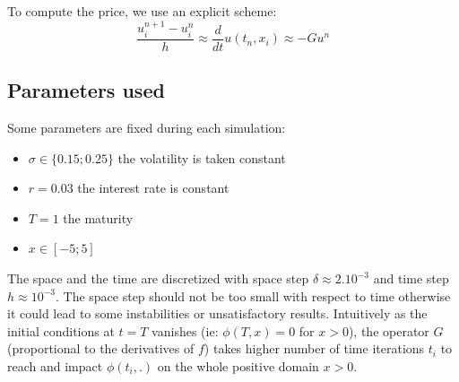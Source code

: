 \documentclass{article}
\begin{document}
To compute the price, we use an explicit scheme:
\[
	\frac{u_{i}^{n+1} -u_{i}^{n}}{h} \approx \frac{d}{dt} u(t_n,x_i)\approx -Gu^{n}
\]

\subsection*{Parameters used}

Some parameters are fixed during each simulation:

\begin{itemize}[label=$\cdot$]
    \item $\sigma\in\{0.15;0.25\}$ the volatility is taken constant
    \item $r=0.03$ the interest rate is constant 
    \item $T=1$ the maturity
    \item $x\in[-5;5]$ 
\end{itemize}

The space and the time are discretized with  space step $\delta \approx 2.10^{-3}$ and time step $h \approx 10^{-3}$.
The space step should not be too small with respect to time otherwise it could lead to some instabilities or unsatisfactory
results. Intuitively as the initial conditions at $t=T$ vanishes (ie: $\phi(T,x) = 0$ for $x > 0$),
the operator $G$ (proportional to the derivatives of $f$) takes higher number of time iterations $t_i$
to reach and impact $\phi(t_i,.)$ on the whole positive domain $x>0$.
\\
\end{document}
